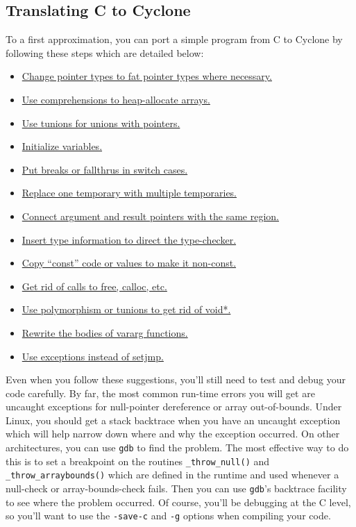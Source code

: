 \subsection{Translating C to Cyclone}
To a first approximation, you can port a simple program
from C to Cyclone by following these steps which are
detailed below:
\begin{itemize}
\item \hyperlink{port:pointers}{Change pointer types to fat pointer types where necessary.}  
\item \hyperlink{port:malloc}{Use comprehensions to heap-allocate arrays.}
\item \hyperlink{port:unions}{Use tunions for unions with pointers.}
\item \hyperlink{port:initialize}{Initialize variables.}  
\item \hyperlink{port:cases}{Put breaks or fallthrus in switch cases.} 
\item \hyperlink{port:temp}{Replace one temporary with multiple temporaries.}  
\item \hyperlink{port:rgns}{Connect argument and result pointers with the same region.}
\item \hyperlink{port:types}{Insert type information to direct the type-checker.}
\item \hyperlink{port:const}{Copy ``const'' code or values to make it non-const.}  
\item \hyperlink{port:free}{Get rid of calls to free, calloc, etc.}
\item \hyperlink{port:poly}{Use polymorphism or tunions to get rid of void*.}  
\item \hyperlink{port:vararg}{Rewrite the bodies of vararg functions.}
\item \hyperlink{port:setjmp}{Use exceptions instead of setjmp.}
\end{itemize}

Even when you follow these suggestions, you'll still need to test and
debug your code carefully.  By far, the most common run-time errors
you will get are uncaught exceptions for null-pointer dereference
or array out-of-bounds.  Under Linux, you should get a stack backtrace
when you have an uncaught exception which will help narrow down
where and why the exception occurred.  On other architectures, you
can use \texttt{gdb} to find the problem.  The most effective way
to do this is to set a breakpoint on the routines \texttt{\_throw\_null()}
and \texttt{\_throw\_arraybounds()} which are defined in the
runtime and used whenever a null-check or array-bounds-check fails.
Then you can use \texttt{gdb}'s backtrace facility to see where
the problem occurred.  Of course, you'll be debugging at the C
level, so you'll want to use the \texttt{-save-c} and \texttt{-g}
options when compiling your code.  

